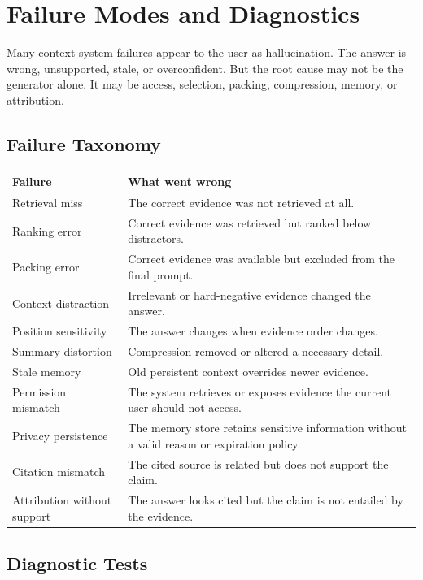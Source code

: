 \section{Failure Modes and Diagnostics}
\label{sec:ch20-failure-diagnostics}

Many context-system failures appear to the user as hallucination. The answer is wrong, unsupported, stale, or overconfident. But the root cause may not be the generator alone. It may be access, selection, packing, compression, memory, or attribution.

\subsection{Failure Taxonomy}

\begin{center}
\begin{tabularx}{\textwidth}{@{}p{}X@{}}
\toprule
\textbf{Failure} & \textbf{What went wrong} \\
\midrule
Retrieval miss & The correct evidence was not retrieved at all. \\
Ranking error & Correct evidence was retrieved but ranked below distractors. \\
Packing error & Correct evidence was available but excluded from the final prompt. \\
Context distraction & Irrelevant or hard-negative evidence changed the answer. \\
Position sensitivity & The answer changes when evidence order changes. \\
Summary distortion & Compression removed or altered a necessary detail. \\
Stale memory & Old persistent context overrides newer evidence. \\
Permission mismatch & The system retrieves or exposes evidence the current user should not access. \\
Privacy persistence & The memory store retains sensitive information without a valid reason or expiration policy. \\
Citation mismatch & The cited source is related but does not support the claim. \\
Attribution without support & The answer looks cited but the claim is not entailed by the evidence. \\
\bottomrule
\end{tabularx}
\end{center}

\subsection{Diagnostic Tests}

